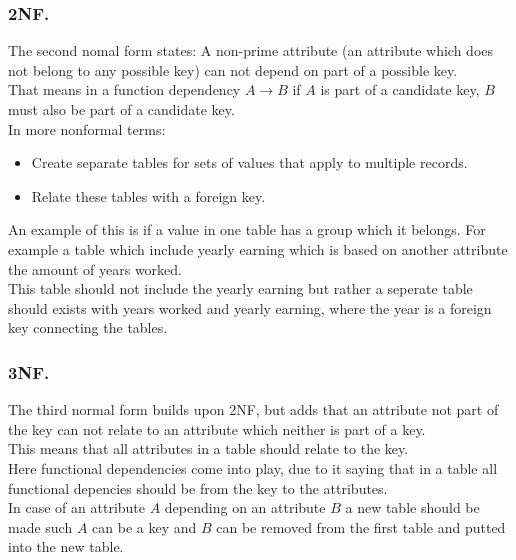 \documentclass[12pt, a4paper]{article}
\begin{document}
			\subsubsection{2NF.}
				The second nomal form states: A non-prime attribute (an attribute which does not belong to any possible key) can not depend on part of a possible key.\\
				That means in a function dependency $A\rightarrow B$ if $A$ is part of a candidate key, $B$ must also be part of a candidate key.\\
				In more nonformal terms:
				\begin{itemize}
					\item Create separate tables for sets of values that apply to multiple records.
  					\item  Relate these tables with a foreign key.
				\end{itemize}
				An example of this is if a value in one table has a group which it belongs. For example a table which include yearly earning which is based on another attribute the amount of years worked.\\
				This table should not include the yearly earning but rather a seperate table should exists with years worked and yearly earning, where the year is a foreign key connecting the tables.
			\subsubsection{3NF.}
				The third normal form builds upon 2NF, but adds that an attribute not part of the key can not relate to an attribute which neither is part of a key.\\
				This means that all attributes in a table should relate to the key.\\
				Here functional dependencies come into play, due to it saying that in a table all functional depencies should be from the key to the attributes.\\
				In case of an attribute $A$ depending on an attribute $B$ a new table should be made such $A$ can be a key and $B$ can be removed from the first table and putted into the new table. 			
\end{document}
